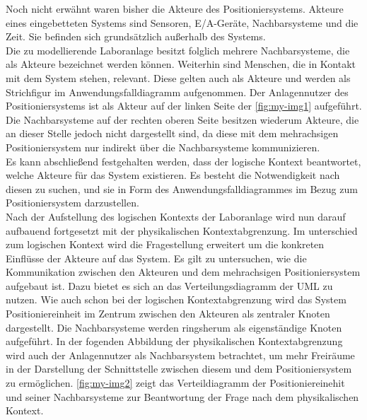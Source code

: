 \documentclass[../Bachelorarbeit.tex]{subfiles}
\begin{document}
Noch nicht erwähnt waren bisher die Akteure des Positioniersystems. Akteure eines eingebetteten Systems sind Sensoren, E/A-Geräte, Nachbarsysteme und die Zeit. Sie befinden sich grundsätzlich außerhalb des Systems. \\ %
Die zu modellierende Laboranlage besitzt folglich mehrere Nachbarsysteme, die als Akteure bezeichnet werden können. Weiterhin sind Menschen, die in Kontakt mit dem System stehen, relevant. Diese gelten auch als Akteure und werden als Strichfigur im Anwendungsfalldiagramm aufgenommen. Der Anlagennutzer des Positioniersystems ist als Akteur auf der linken Seite der \autoref{fig:my-img1} aufgeführt. Die Nachbarsysteme auf der rechten oberen Seite besitzen wiederum Akteure, die an dieser Stelle jedoch nicht dargestellt sind, da diese mit dem mehrachsigen Positioniersystem nur indirekt über die Nachbarsysteme kommunizieren.\\
Es kann abschließend festgehalten werden, dass der logische Kontext beantwortet, welche Akteure für das System existieren. Es besteht die Notwendigkeit nach diesen zu suchen, und sie in Form des Anwendungsfalldiagrammes im Bezug zum Positioniersystem darzustellen.\\
Nach der Aufstellung des logischen Kontexts der Laboranlage wird nun darauf aufbauend fortgesetzt mit der physikalischen Kontextabgrenzung. Im unterschied zum logischen Kontext wird die Fragestellung erweitert um die konkreten Einflüsse der Akteure auf das System. Es gilt zu untersuchen, wie die Kommunikation zwischen den Akteuren und dem mehrachsigen Positioniersystem aufgebaut ist. Dazu bietet es sich an das Verteilungsdiagramm der UML zu nutzen. Wie auch schon bei der logischen Kontextabgrenzung wird das System Positioniereinheit im Zentrum zwischen den Akteuren als zentraler Knoten dargestellt. Die Nachbarsysteme werden ringsherum als eigenständige Knoten aufgeführt. In der fogenden Abbildung der physikalischen Kontextabgrenzung wird auch der Anlagennutzer als Nachbarsystem betrachtet, um mehr Freiräume in der Darstellung der Schnittstelle zwischen diesem und dem Positioniersystem zu ermöglichen. \autoref{fig:my-img2} zeigt das Verteildiagramm der Positioniereinehit und seiner Nachbarsysteme zur Beantwortung der Frage nach dem physikalischen Kontext.\\
\end{document}
